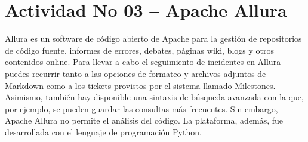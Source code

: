 \section{Actividad No 03 – Apache Allura} 
Allura es un software de c\'odigo abierto de Apache para la gestión de repositorios de c\'odigo fuente, informes de errores, debates, p\'aginas wiki, blogs y otros contenidos online. Para llevar a cabo el seguimiento de incidentes en Allura puedes recurrir tanto a las opciones de formateo y archivos adjuntos de Markdown como a los tickets provistos por el sistema llamado Milestones. Asimismo, también hay disponible una sintaxis de b\'usqueda avanzada con la que, por ejemplo, se pueden guardar las consultas más frecuentes. Sin embargo, Apache Allura no permite el an\'alisis del c\'odigo. La plataforma, adem\'as, fue desarrollada con el lenguaje de programaci\'on Python.

